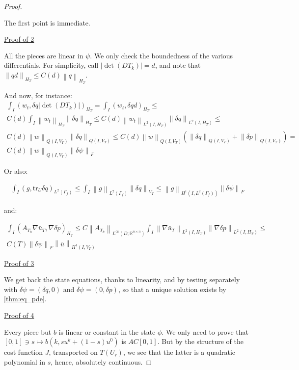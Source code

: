 \documentclass[english,a4paper,12pt,oneside]{scrbook}
\theoremstyle{break}
\newenvironment{mproof}[1][\proofname]{%
  \begin{proof}[#1]$ $\par\nobreak\ignorespaces
}{%
  \end{proof}
}
\renewcommand*{\proofname}{Proof}
\theoremstyle{remark}
\newcommand{\mR}{\mathbb{R}}
\newcommand{\norm}[1]{\left\lVert#1\right\rVert}
\newcommand{\tr}{\text{tr}}
\begin{document}
\begin{mproof}

The first point is immediate.

\underline{Proof of 2}

All the pieces are linear in $\psi$. We only check the boundedness of the various differentials. For simplicity, call $|\det(DT_k)|=d$, and note that   $\norm{qd}_{H_T}\leq C(d)\norm{q}_{H_T}$.

And now, for instance:
\begin{align*}
\int_I ( w_t , \delta q |\det(DT_k)|)_{H_T} = \int_I ( w_t , \delta q d )_{H_T}\leq\\ C(d) \int_I \norm{w_t}_{H_T}\norm{\delta q}_{H_T}\leq C(d) \norm{w_t}_{L^2(I,H_T)}\norm{\delta q}_{L^2(I,H_T)}\leq\\C(d) \norm{w}_{Q(I,V_T)}\norm{\delta q}_{Q(I,V_T)}\leq
C(d) \norm{w}_{Q(I,V_T)}(\norm{\delta q}_{Q(I,V_T)}+\norm{\delta p}_{Q(I,V_T)}) =\\ C(d) \norm{w}_{Q(I,V_T)}\norm{\delta\psi}_F
\end{align*}

Or also:

\begin{align*}
\int_I(g,\tr_{U} \delta q)_{L^2(\Gamma_f)}\leq \int_I \norm{g}_{L^2(\Gamma_f)}\norm{\delta q}_{V_T}\leq \norm{g}_{H^1(I,L^2(\Gamma_f))}\norm{\delta\psi}_F
\end{align*}

and:

\begin{align*}
\int_I (A_{T_k} \nabla \bar{u}_T, \nabla\delta p)_{H_T}\leq C\norm{A_{T_k}}_{L^\infty(D;\mR^{n\times n})}\int_I \norm{\nabla \bar{u}_T}_{L^2(I,H_T)}\norm{\nabla\delta p}_{L^2(I,H_T)}\leq\\ C(T) \norm{\delta\psi}_F \norm{\bar{u}}_{H^1(I,V_T)}
\end{align*}

\underline{Proof of 3}

We get back the state equations, thanks to linearity, and by testing separately with $\delta \psi =(\delta q, 0)$ and $\delta \psi = (0,\delta p)$, so that a unique solution exists by \cref{thm:eq_pde}.

\underline{Proof of 4}

Every piece but $b$ is linear or constant in the state $\phi$. We only need to prove that $[0,1]\ni s \mapsto b(k, su^k + (1-s)u^0)$ is $AC[0,1]$. But by the structure of the cost function $J$, transported on $T(U_r)$, we see that the latter is a quadratic polynomial in $s$, hence, absolutely continuous.


\end{mproof}
\end{document}
